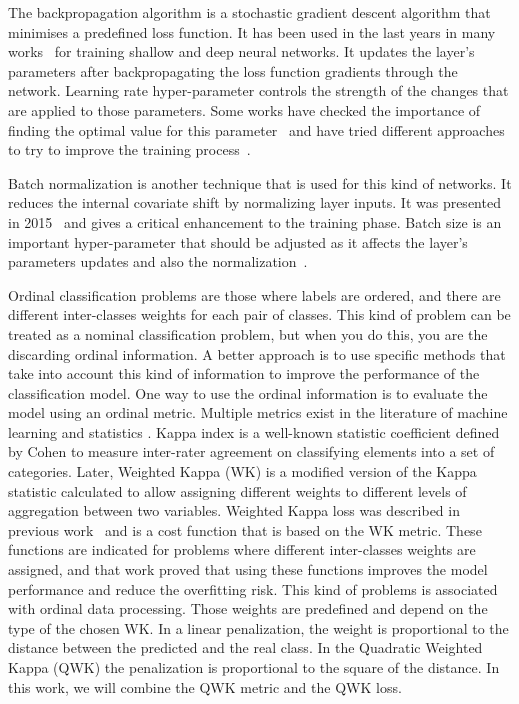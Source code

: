 \documentclass[journal]{IEEEtran}
\begin{document}
	The backpropagation algorithm is a stochastic gradient descent algorithm that minimises a predefined loss function. It has been used in the last years in many works~\cite{leonard1990improvement, yu1995dynamic, krizhevsky2012imagenet, de2018weighted} for training shallow and deep neural networks. It updates the layer's parameters after backpropagating the loss function gradients through the network. Learning rate hyper-parameter controls the strength of the changes that are applied to those parameters. Some works have checked the importance of finding the optimal value for this parameter~\cite{senior2013empirical} and have tried different approaches to try to improve the training process~\cite{smith2017cyclical}.
	
	Batch normalization is another technique that is used for this kind of networks. It reduces the internal covariate shift by normalizing layer inputs. It was presented in 2015~\cite{ioffe2015batch} and gives a critical enhancement to the training phase. Batch size is an important hyper-parameter that should be adjusted as it affects the layer's parameters updates and also the normalization~\cite{keskar2016large}\cite{radiuk2017impact}.
	
	Ordinal classification problems are those where labels are ordered, and there are different inter-classes weights for each pair of classes. This kind of problem can be treated as a nominal classification problem, but when you do this, you are the discarding ordinal information. A better approach is to use specific methods that take into account this kind of information to improve the performance of the classification model. One way to use the ordinal information is to evaluate the model using an ordinal metric. Multiple metrics exist in the literature of machine learning and statistics \cite{cruz2014metrics, mehdiyev2016evaluating}. Kappa index is a well-known statistic coefficient defined by Cohen \cite{cohen1960coefficient} to measure inter-rater agreement on classifying elements into a set of categories. Later, Weighted Kappa (WK) is a modified version of the Kappa statistic calculated to allow assigning different weights to different levels of aggregation between two variables. Weighted Kappa loss was described in previous work~\cite{de2018weighted} and is a cost function that is based on the WK metric. These functions are indicated for problems where different inter-classes weights are assigned, and that work proved that using these functions improves the model performance and reduce the overfitting risk. This kind of problems is associated with ordinal data processing. Those weights are predefined and depend on the type of the chosen WK. In a linear penalization, the weight is proportional to the distance between the predicted and the real class. In the Quadratic Weighted Kappa (QWK) the penalization is proportional to the square of the distance. In this work, we will combine the QWK metric and the QWK loss.
	
\end{document}
